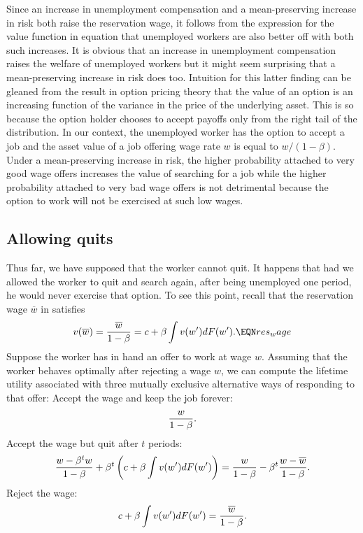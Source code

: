 Since  an increase in unemployment compensation and a mean-preserving
increase in risk both raise the reservation wage, it follows from the expression
for the value function in equation  that unemployed workers are
also better off with both such increases. It is obvious that an increase
in unemployment compensation raises the welfare of unemployed workers but
it might seem surprising that  a mean-preserving increase in risk does too.
Intuition for this latter finding can be gleaned from the result in option
pricing theory that the value of an option is an increasing function of
the variance in the price of the underlying asset. This is so because
the option holder chooses to accept  payoffs only from the right tail of
the distribution. In our context, the unemployed worker has the option
to accept a job and the asset value of a job offering wage rate $w$ is
equal to $w/(1-\beta)$.
Under a mean-preserving increase in risk, the higher probability attached to  very
good wage offers increases the value of searching for a job while
the higher probability attached to very bad wage offers is not detrimental because
the option to work will  not be exercised at such low
wages.

\subsection{Allowing quits}\label{quits}%
 Thus far, we have supposed that the worker cannot quit.
It happens that had we allowed the worker to
quit and search again, after being unemployed one period,
he would never exercise that option.  To see this point,
recall that the reservation wage $\overline w$ in  satisfies
 $$
 v(\overline w) = {\overline w \over 1-\beta}= c+\beta \int v(w')dF(w'). \EQN res_wage
 $$
 Suppose the worker has in hand an offer to work at wage $w$.
 Assuming that
 the worker behaves optimally after rejecting a wage $w$,
we can
 compute the lifetime utility associated with
three mutually exclusive alternative ways of responding to that offer:
\medskip
  Accept the wage and keep the job forever:
 $$
 {w \over 1-\beta}.
 $$
  Accept the wage but quit after $t$ periods:
 $$
 {w -\beta^t w \over 1 - \beta} +
 \beta^t \left(c+\beta \int v(w')dF(w')\right)
 = {w \over 1 - \beta} - \beta^t {w -\overline w \over 1 - \beta}.
 $$
  Reject the wage:
 $$
 c+\beta \int v(w')dF(w') = {\overline w \over 1-\beta}.
 $$

